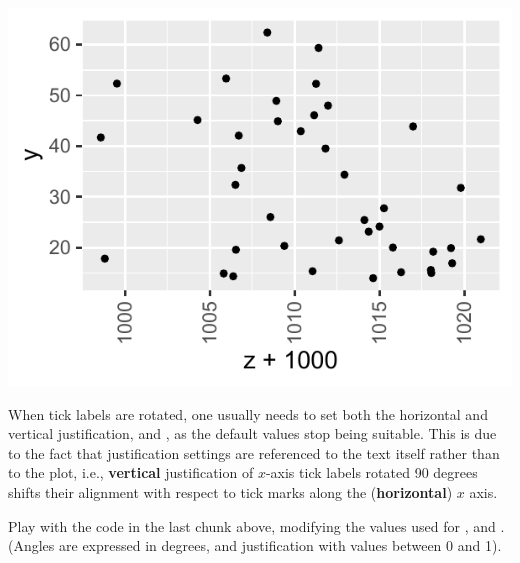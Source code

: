 \documentclass[krantz2]{krantz}\usepackage{knitr}
\begin{document}
\begin{knitrout}\footnotesize
{}\color{fgcolor}\begin{kframe}
\begin{alltt}
  \hlopt{+}  \hlopt{+}
  \hlstd{()} \hlopt{+}
  \hlstd{(} \hlopt{::}\hlstd{(} \hlstd{=} \hlstd{))} \hlopt{+}
  \hlstd{(} \hlstd{=} \hlstd{(} \hlstd{=} \hlstd{,}  \hlstd{=} \hlstd{,}  \hlstd{=} \hlstd{))}
\end{alltt}
\end{kframe}

{\centering \includegraphics[width=.54\textwidth]{figure/pos-themes-11-1} 

}


\end{knitrout}

\begin{warningbox}
When tick labels are rotated, one usually needs to set both the horizontal and vertical justification,  and , as the default values stop being suitable. This is due to the fact that justification settings are referenced to the text itself rather than to the plot, i.e., \textbf{vertical} justification of $x$-axis tick labels rotated 90 degrees shifts their alignment with respect to tick marks along the (\textbf{horizontal}) $x$ axis.
\end{warningbox}

\begin{playground}
Play with the code in the last chunk above, modifying the values used for ,  and . (Angles are expressed in degrees, and justification with values between 0 and 1).
\end{playground}
\end{document}
